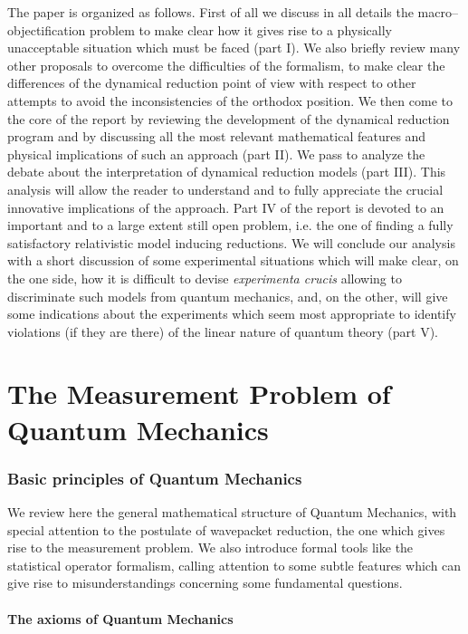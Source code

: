 \documentclass[10pt,a4paper]{article}
\begin{document}
The paper is organized as follows. First of all we discuss in all
details the macro--objectification problem to make clear how it
gives rise to a physically unacceptable situation which must be
faced (part I). We also briefly review many other proposals to
overcome the difficulties of the formalism, to make clear  the
differences of the dynamical reduction point of view with respect
to  other attempts to avoid the inconsistencies of the orthodox
position. We then come to the core of the report by reviewing the
development of the dynamical reduction program and by discussing
all the most relevant mathematical features and physical
implications of such an approach (part II). We pass to analyze the debate
about the interpretation of  dynamical reduction models (part III).
This analysis will allow the reader to understand and to fully
appreciate the crucial innovative implications of the approach. Part IV
of the report is devoted to an important and to a large extent still open
problem, i.e. the one of finding a fully satisfactory relativistic
model inducing reductions.  We
will conclude our analysis with a short discussion of some
experimental situations which will make clear, on the one side,
how it is difficult to devise {\it experimenta crucis} allowing to
discriminate such models from quantum mechanics, and, on the
other, will give some indications about the experiments which seem
most appropriate to identify violations (if they are there) of the
linear nature of quantum theory (part V).


\part{The Measurement Problem of Quantum Mechanics}

\section{Basic principles of Quantum Mechanics} \label{sec1}


We review here the general mathematical structure of Quantum
Mechanics, with special attention to the postulate of wavepacket
reduction, the one which gives rise to the measurement problem. We
also introduce formal tools like the statistical operator
formalism, calling attention to some subtle features which can
give rise to misunderstandings concerning some fundamental
questions.

\subsection{The axioms of Quantum Mechanics} \label{sec11}
\end{document}
